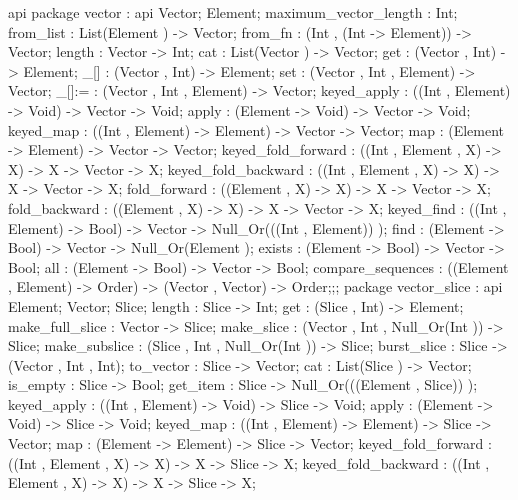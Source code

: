 api {   package vector
          : api {
                Vector;
                Element;
                maximum_vector_length : Int;
                from_list : List(Element ) -> Vector;
                from_fn : (Int , (Int -> Element)) -> Vector;
                length : Vector -> Int;
                cat : List(Vector ) -> Vector;
                get : (Vector , Int) -> Element;
                _[] : (Vector , Int) -> Element;
                set : (Vector , Int , Element) -> Vector;
                _[]:= : (Vector , Int , Element) -> Vector;
                keyed_apply : ((Int , Element) -> Void) -> Vector -> Void;
                apply : (Element -> Void) -> Vector -> Void;
                keyed_map : ((Int , Element) -> Element) -> Vector -> Vector;
                map : (Element -> Element) -> Vector -> Vector;
                keyed_fold_forward : ((Int , Element , X) -> X) -> X -> Vector -> X;
                keyed_fold_backward : ((Int , Element , X) -> X) -> X -> Vector -> X;
                fold_forward : ((Element , X) -> X) -> X -> Vector -> X;
                fold_backward : ((Element , X) -> X) -> X -> Vector -> X;
                keyed_find : ((Int , Element) -> Bool) -> Vector -> Null_Or(((Int , Element)) );
                find : (Element -> Bool) -> Vector -> Null_Or(Element );
                exists : (Element -> Bool) -> Vector -> Bool;
                all : (Element -> Bool) -> Vector -> Bool;
                compare_sequences : ((Element , Element) -> Order) -> (Vector , Vector) -> Order;};;
        package vector_slice
          : api {
                Element;
                Vector;
                Slice;
                length : Slice -> Int;
                get : (Slice , Int) -> Element;
                make_full_slice : Vector -> Slice;
                make_slice : (Vector , Int , Null_Or(Int )) -> Slice;
                make_subslice : (Slice , Int , Null_Or(Int )) -> Slice;
                burst_slice : Slice -> (Vector , Int , Int);
                to_vector : Slice -> Vector;
                cat : List(Slice ) -> Vector;
                is_empty : Slice -> Bool;
                get_item : Slice -> Null_Or(((Element , Slice)) );
                keyed_apply : ((Int , Element) -> Void) -> Slice -> Void;
                apply : (Element -> Void) -> Slice -> Void;
                keyed_map : ((Int , Element) -> Element) -> Slice -> Vector;
                map : (Element -> Element) -> Slice -> Vector;
                keyed_fold_forward : ((Int , Element , X) -> X) -> X -> Slice -> X;
                keyed_fold_backward : ((Int , Element , X) -> X) -> X -> Slice -> X;
}}
